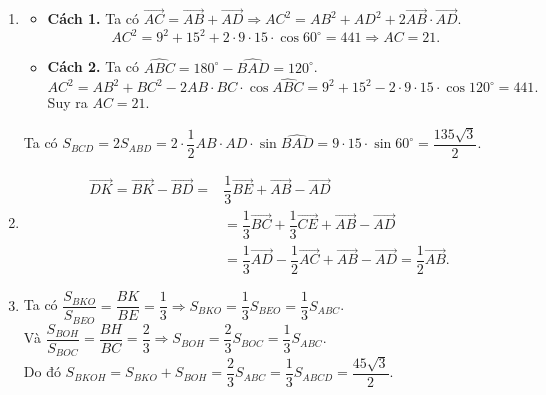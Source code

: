 \begin{bt}
{\begin{center}
\begin{tikzpicture}[scale=1.2, >=stealth, font=\footnotesize, line join=round, line cap=round]
		\end{tikzpicture}
		\end{center}
		\begin{enumerate}
			\item
			\begin{itemize}
				\item \textbf{Cách 1.} Ta có $\overrightarrow{A C}=\overrightarrow{A B}+\overrightarrow{A D} \Rightarrow A C^2=A B^2+A D^2+2 \overrightarrow{A B} \cdot \overrightarrow{A D}$.
				$$
				A C^2=9^2+15^2+2 \cdot 9 \cdot 15 \cdot \cos 60^{\circ}=441 \Rightarrow A C=21.
				$$
				\item \textbf{Cách 2.} Ta có $\widehat{A B C}=180^{\circ}-\widehat{B A D}=120^{\circ}$.\\
				$$ A C^2=A B^2+B C^2-2 A B \cdot B C \cdot \cos \widehat{A B C} =9^2+15^2-2 \cdot 9 \cdot 15 \cdot \cos 120^{\circ}=441.$$
				Suy ra $ AC=21 $.
			\end{itemize}
			Ta có $
			S_{ B C D}=2 S_{A B D}=2 \cdot \dfrac{1}{2} A B \cdot A D \cdot \sin \widehat{B A D}=9 \cdot 15 \cdot \sin 60^{\circ}=\dfrac{135 \sqrt{3}}{2}.
			$
			\item
			\begin{eqnarray*}
				& \overrightarrow{D K}=\overrightarrow{B K}-\overrightarrow{B D}=&\dfrac{1}{3} \overrightarrow{B E}+\overrightarrow{A B}-\overrightarrow{A D} \\
				& &=\dfrac{1}{3} \overrightarrow{B C}+\dfrac{1}{3} \overrightarrow{C E}+\overrightarrow{A B}-\overrightarrow{A D}\\
				& &=\dfrac{1}{3} \overrightarrow{A D}-\dfrac{1}{2} \overrightarrow{A C}+\overrightarrow{A B}-\overrightarrow{A D}=\dfrac{1}{2} \overrightarrow{A B}.
			\end{eqnarray*}
			\item
			Ta có
			$\dfrac{S_{B K O}}{S_{B E O}}=\dfrac{B K}{B E}=\dfrac{1}{3} \Rightarrow S_{B K O}=\dfrac{1}{3} S_{B E O}=\dfrac{1}{3} S_{AB C} $.\\
			Và $\dfrac{S_{B O H}}{S_{B O C}}=\dfrac{B H}{B C}=\dfrac{2}{3} \Rightarrow S_{B O H}=\dfrac{2}{3} S_{B O C}=\dfrac{1}{3} S_{AB C}$.\\
			Do đó $S_{B K O H}=S_{B K O}+S_{B O H}=\dfrac{2}{3} S_{A B C}=\dfrac{1}{3} S_{A B C D}=\dfrac{45 \sqrt{3}}{2}$.
		\end{enumerate}
	}
\end{bt}


